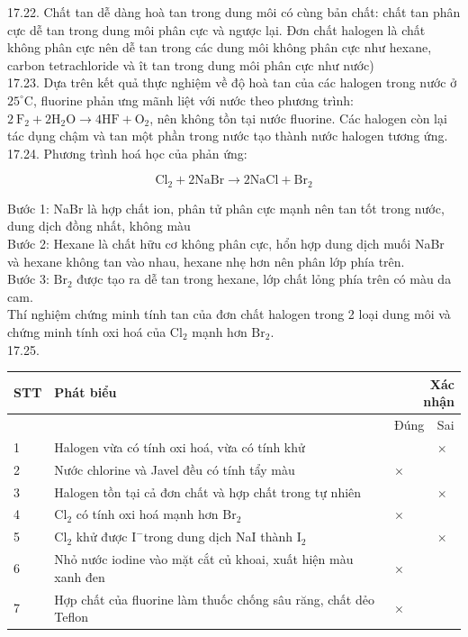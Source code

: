 \documentclass[10pt]{article}
\begin{document}
17.22. Chất tan dễ dàng hoà tan trong dung môi có cùng bản chất: chất tan phân cực dễ tan trong dung môi phân cực và ngược lại. Đơn chất halogen là chất không phân cực nên dễ tan trong các dung môi không phân cực như hexane, carbon tetrachloride và ît tan trong dung môi phân cực như nước)\\
17.23. Dựa trên kết quả thực nghiệm về độ hoà tan của các halogen trong nước ở $25^{\circ} \mathrm{C}$, fluorine phản ưng mãnh liệt với nước theo phương trình: $2 \mathrm{~F}_{2}+2 \mathrm{H}_{2} \mathrm{O} \rightarrow 4 \mathrm{HF}+\mathrm{O}_{2}$, nên không tồn tại nước fluorine. Các halogen còn lại tác dụng chậm và tan một phần trong nước tạo thành nước halogen tương ứng.\\
17.24. Phương trình hoá học của phản ứng:

$$
\mathrm{Cl}_{2}+2 \mathrm{NaBr} \rightarrow 2 \mathrm{NaCl}+\mathrm{Br}_{2}
$$

Bước 1: NaBr là hợp chất ion, phân tử phân cực mạnh nên tan tốt trong nước, dung dịch đồng nhất, không màu\\
Bước 2: Hexane là chất hữu cơ không phân cực, hổn hợp dung dịch muối NaBr và hexane không tan vào nhau, hexane nhẹ hơn nên phân lớp phía trên.\\
Bước 3: $\mathrm{Br}_{2}$ được tạo ra dễ tan trong hexane, lớp chất lỏng phía trên có màu da cam.\\
Thí nghiệm chứng minh tính tan của đơn chất halogen trong 2 loại dung môi và chứng minh tính oxi hoá của $\mathrm{Cl}_{2}$ mạnh hơn $\mathrm{Br}_{2}$.\\
17.25.

\begin{center}
\begin{tabular}{|l|l|l|l|}
\hline
\multirow{2}{*}{STT} & \multirow{2}{*}{Phát biểu} & \multicolumn{2}{|r|}{Xác nhận} \\
\hline
 &  & Đúng & Sai \\
\hline
1 & Halogen vừa có tính oxi hoá, vừa có tính khử &  & $\times$ \\
\hline
2 & Nước chlorine và Javel đều có tính tẩy màu & $\times$ &  \\
\hline
3 & Halogen tồn tại cả đơn chất và hợp chất trong tự nhiên &  & $\times$ \\
\hline
4 & $\mathrm{Cl}_{2}$ có tính oxi hoá mạnh hơn $\mathrm{Br}_{2}$ & $\times$ &  \\
\hline
5 & $\mathrm{Cl}_{2}$ khử được $\mathrm{I}^{-}$trong dung dịch NaI thành $\mathrm{I}_{2}$ &  & $\times$ \\
\hline
6 & Nhỏ nước iodine vào mặt cắt củ khoai, xuất hiện màu xanh đen & $\times$ &  \\
\hline
7 & Hợp chất của fluorine làm thuốc chống sâu răng, chất dẻo Teflon & $\times$ &  \\
\hline
\end{tabular}
\end{center}
\end{document}
